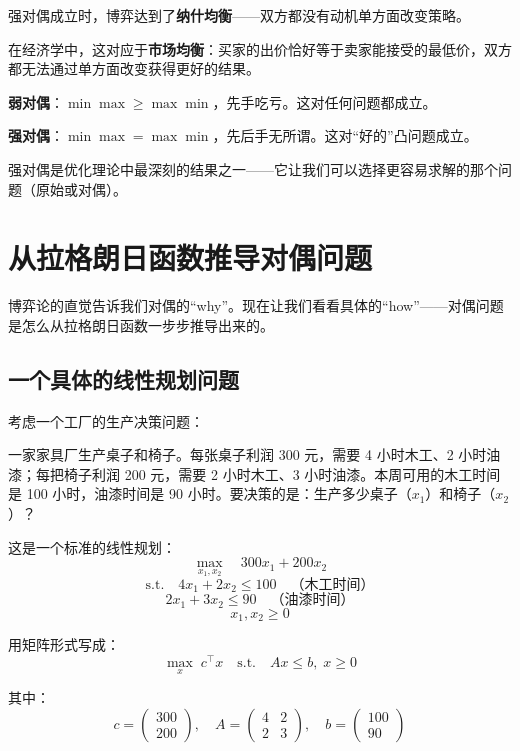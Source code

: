 \begin{physicalmeaning}
强对偶成立时，博弈达到了\textbf{纳什均衡}——双方都没有动机单方面改变策略。

在经济学中，这对应于\textbf{市场均衡}：买家的出价恰好等于卖家能接受的最低价，双方都无法通过单方面改变获得更好的结果。
\end{physicalmeaning}

\begin{insightbox}
\textbf{弱对偶}：$\min\max \geq \max\min$，先手吃亏。这对任何问题都成立。

\textbf{强对偶}：$\min\max = \max\min$，先后手无所谓。这对“好的”凸问题成立。

强对偶是优化理论中最深刻的结果之一——它让我们可以选择更容易求解的那个问题（原始或对偶）。
\end{insightbox}

\section{从拉格朗日函数推导对偶问题}

博弈论的直觉告诉我们对偶的“why”。现在让我们看看具体的“how”——对偶问题是怎么从拉格朗日函数一步步推导出来的。

\subsection{一个具体的线性规划问题}

考虑一个工厂的生产决策问题：

\begin{example}[家具厂的困境]
一家家具厂生产桌子和椅子。每张桌子利润 300 元，需要 4 小时木工、2 小时油漆；每把椅子利润 200 元，需要 2 小时木工、3 小时油漆。本周可用的木工时间是 100 小时，油漆时间是 90 小时。要决策的是：生产多少桌子（$x_1$）和椅子（$x_2$）？
\end{example}

这是一个标准的线性规划：
\[
\max_{x_1, x_2} \quad 300 x_1 + 200 x_2
\]
\[
\text{s.t.} \quad 4x_1 + 2x_2 \leq 100 \quad \text{（木工时间）}
\]
\[
2x_1 + 3x_2 \leq 90 \quad \text{（油漆时间）}
\]
\[
x_1, x_2 \geq 0
\]

用矩阵形式写成：
\[
\max_x \; c^\top x \quad \text{s.t.} \quad Ax \leq b, \; x \geq 0
\]

其中：
\[
c = \begin{pmatrix} 300 \\ 200 \end{pmatrix}, \quad
A = \begin{pmatrix} 4 & 2 \\ 2 & 3 \end{pmatrix}, \quad
b = \begin{pmatrix} 100 \\ 90 \end{pmatrix}
\]

